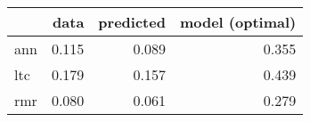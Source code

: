 \begin{tabular}{lrrr}
\toprule
{} &   data &  predicted &  model (optimal) \\
\midrule
ann &  0.115 &      0.089 &            0.355 \\
ltc &  0.179 &      0.157 &            0.439 \\
rmr &  0.080 &      0.061 &            0.279 \\
\bottomrule
\end{tabular}
